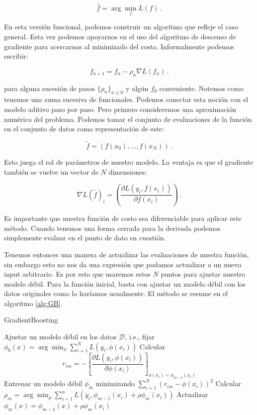 $$ \hat f = \arg\min_f L(f) \,.$$

En esta versión funcional, podemos construir un algoritmo que refleje el caso general. Esta vez podemos apoyarnos en el uso del algoritmo de descenso de gradiente para acercarnos al minimizado del costo. Informalmente podemos escribir:

$$ f_{n+1} = f_n - \rho_n \nabla L(f_n) \,.$$

para alguna sucesión de pasos $\{\rho_n\}_{n\geq 0}$ y algún $f_0$ conveniente. Notemos como tenemos una suma sucesiva de funcionales. Podemos conectar esta noción con el modelo aditivo paso por paso. Pero primero consideremos una aproximación numérica del problema. Podemos tomar el conjunto de evaluaciones de la función en el conjunto de datos como representación de este:

$$ \tilde f = \left( f(x_0), \dots, f(x_N) \right) \,. $$

Esto juega el rol de parámetros de nuestro modelo. La ventaja es que el gradiente también se vuelve un vector de $N$ dimensiones:

$$ \nabla L(\tilde f)_i = \left( \frac{\partial L(y_i,f(x_i))}{\partial f(x_i)} \right) \,. $$

Es importante que nuestra función de costo sea diferenciable para aplicar este método. Cuando tenemos una forma cerrada para la derivada podemos simplemente evaluar en el punto de dato en cuestión.

Tenemos entonces una manera de actualizar las evaluaciones de nuestra función, sin embargo esto no nos da una expresión que podamos actualizar a un nuevo input arbitrario. Es por esto que usaremos estos $N$ puntos para ajustar nuestro modelo débil. Para la función inicial, basta con ajustar un modelo débil con los datos originales como lo haríamos usualmente. El método se resume en el algoritmo \ref{alg:GB}.

\begin{algorithm}[H]
\caption{GradientBoosting
\label{alg:GB}}
    \begin{algorithmic}[1]
        \State Ajustar un modelo débil en los datos $\mathcal{D}$, i.e., fijar $\phi_0(x) = \arg\min_\phi \sum^N_{i=1} L(y_i,\phi(x_i))$
            \State Calcular 
            $$ r_{im} = - \left[ \frac{\partial L(y_i, \phi(x_i))}{\partial \phi(x_i)} \right]_{\phi(x_i) = \phi_{m-1}(x_i)} $$
            \State Entrenar un modelo débil $\phi_m$  minimizando $\displaystyle \sum_{i=1}^N(r_{im} - \phi(x_i))^2$
            \State Calcular $\rho_m = \arg\min_\rho \sum^n_{i=1} L(y_i,\phi_{m-1}(x_i) + \rho \phi_m(x_i))$
            \State Actualizar $\phi_m(x) = \phi_{m-1}(x) + \rho \phi_m(x_i) $
        \EndFor
    \EndFunction
    \end{algorithmic}
\end{algorithm}

